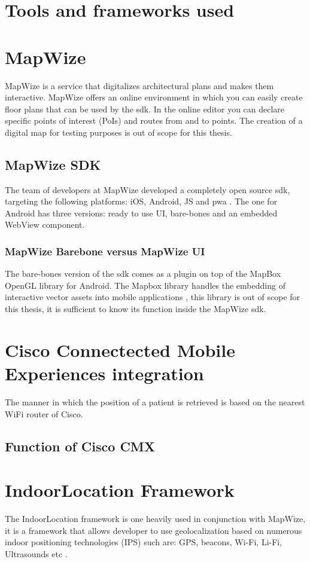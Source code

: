 \section{Tools and frameworks used}
\section{MapWize}
MapWize is a service that digitalizes architectural plans and makes them interactive. MapWize offers an online environment in which you can easily create floor plans that can be used by the \acrshort{sdk}. In the online editor you can declare specific points of interest (PoIs) and routes from and to points. The creation of a digital map for testing purposes is out of scope for this thesis.
\subsection{MapWize SDK}
The team of developers at MapWize developed a completely open source \acrshort{sdk}, targeting the following platforms: iOS, Android, JS and \acrfull{pwa} \cite{MapWize.io2019a}. The one for Android has three versions: ready to use UI, bare-bones and an embedded WebView component.
\subsubsection{MapWize Barebone versus MapWize UI}
The bare-bones version of the \acrshort{sdk} comes as a plugin on top of the MapBox OpenGL library for Android. The Mapbox library handles the embedding of interactive vector assets into mobile applications \cite{Mabox2019}, this library is out of scope for this thesis, it is sufficient to know its function inside the MapWize \acrshort{sdk}. 

\section{Cisco Connectected Mobile Experiences integration}
The manner in which the position of a patient is retrieved is based on the nearest WiFi router of Cisco.
\subsection{Function of Cisco CMX}

\section{IndoorLocation Framework}
The IndoorLocation framework is one heavily used in conjunction with MapWize, it is a framework that allows developer to use geolocalization based on numerous indoor positioning technologies (IPS) such are: GPS, beacons, Wi-Fi, Li-Fi, Ultrasounds etc \cite{IndoorLocation.io2019}.

